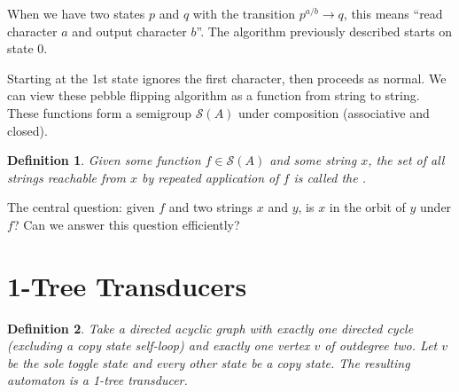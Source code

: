 \documentclass[a0,landscape, 16pt]{a0poster}
\newcommand*{\concourse}{\fontspec[]{Concourse T4}\selectfont}
\theoremstyle{pleasant}
\newtheorem{definition}{Definition}
\newcommand{\0}{\underline{0}}
\newcommand{\1}{\underline{1}}
\newcommand{\2}{\underline{2}}
\renewcommand{\S}{\mathcal{S}}
\begin{document}
\begin{multicols}{3}
\begin{center}
\end{center}

When we have two states $p$ and $q$ with the transition $p ^{a/b}\rightarrow q$, this means ``read character $a$ and output character $b$''. %
The algorithm previously described starts on state 0.

Starting at the 1st state ignores the first character, then proceeds as normal. We can view these pebble flipping algorithm as a function from string to string. These functions form a semigroup $\S(A)$ under composition (associative and closed).

\begin{definition}
Given some function $f \in \S(A)$ and some string $x$, the set of all strings reachable from $x$ by repeated application of $f$ is called the {\normalfont\concourse{orbit of $x$ under $f$}}.
\end{definition}

The central question: given $f$ and two strings $x$ and $y$, is $x$ in the orbit of $y$ under $f$? Can we answer this question efficiently?

\vfill
\columnbreak
\section*{1-Tree Transducers}

\begin{definition}
Take a directed acyclic graph with exactly one directed cycle (excluding a copy state self-loop) and exactly one vertex $v$ of outdegree two. Let $v$ be the sole toggle state and every other state be a copy state. The resulting automaton is a 1-tree transducer.
\end{definition}


\end{multicols}
\end{document}
